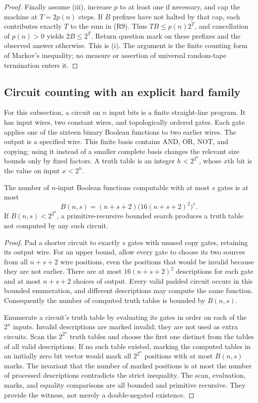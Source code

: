 \begin{proof}
Finally assume (iii), increase $p$ to at least one if necessary, and cap
the machine at $T=2p(n)$ steps. If $B$ prefixes have not halted by that
cap, each contributes exactly $T$ to the sum in (R9). Thus
$TB\leq p(n)2^T$, and cancellation of $p(n)>0$ yields
$2B\leq2^T$. Return question mark on these prefixes and the observed
answer otherwise. This is (i). The argument is the finite counting form
of Markov's inequality; no measure or assertion of universal random-tape
termination enters it.
\end{proof}


\subsection{Circuit counting with an explicit hard family}

For this subsection, a circuit on $n$ input bits is a finite straight-line
program. It has input wires, two constant wires, and topologically ordered
gates. Each gate applies one of the sixteen binary Boolean functions to two
earlier wires. The output is a specified wire. This finite basis contains
AND, OR, NOT, and copying; using it instead of a smaller complete basis
changes the relevant size bounds only by fixed factors. A truth table is
an integer $h<2^{2^n}$, whose $x$th bit is the value on input $x<2^n$.

\begin{theorem}\label{thm:R10}
The number of $n$-input Boolean functions computable with at most $s$ gates
is at most
\[
 B(n,s)=(n+s+2)\bigl(16(n+s+2)^2\bigr)^s.
\]
If $B(n,s)<2^{2^n}$, a primitive-recursive bounded search produces a truth
table not computed by any such circuit.
\end{theorem}
\begin{proof}
Pad a shorter circuit to exactly $s$ gates with unused copy gates, retaining
its output wire. For an upper bound, allow every gate to choose its two
sources from all $n+s+2$ wire positions, even the positions that would be
invalid because they are not earlier. There are at most
$16(n+s+2)^2$ descriptions for each gate and at most $n+s+2$ choices of
output. Every valid padded circuit occurs in this bounded enumeration,
and different descriptions may compute the same function. Consequently
the number of computed truth tables is bounded by $B(n,s)$.

Enumerate a circuit's truth table by evaluating its gates in order on
each of the $2^n$ inputs. Invalid descriptions are marked invalid; they
are not used as extra circuits. Scan the $2^{2^n}$ truth tables and choose
the first one distinct from the tables of all valid descriptions. If no
such table existed, marking the computed tables in an initially zero
bit vector would mark all $2^{2^n}$ positions with at most $B(n,s)$ marks.
The invariant that the number of marked positions is at most the number
of processed descriptions contradicts the strict inequality. The scan,
evaluation, marks, and equality comparisons are all bounded and primitive
recursive. They provide the witness, not merely a double-negated existence.
\end{proof}

